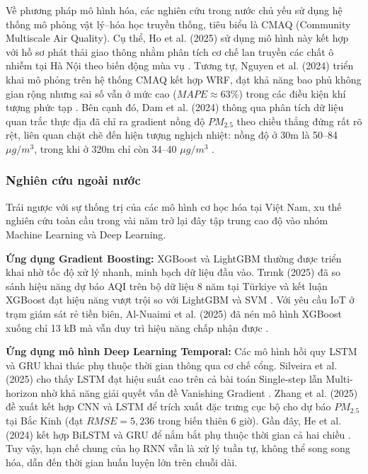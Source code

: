 Về phương pháp mô hình hóa, các nghiên cứu trong nước chủ yếu sử dụng hệ thống mô phỏng vật lý--hóa học truyền thống, tiêu biểu là CMAQ (Community Multiscale Air Quality). 
Cụ thể, Ho et al. (2025) sử dụng mô hình này kết hợp với hồ sơ phát thải giao thông nhằm phân tích cơ chế lan truyền các chất ô nhiễm tại Hà Nội theo biến động mùa vụ \cite{ho2025assessment}. Tương tự, Nguyen et al. (2024) triển khai mô phỏng trên hệ thống CMAQ kết hợp WRF, đạt khả năng bao phủ không gian rộng nhưng sai số vẫn ở mức cao ($MAPE \approx 63\%$) trong các điều kiện khí tượng phức tạp \cite{nguyen2024cmaq}. 
Bên cạnh đó, Dam et al. (2024) thông qua phân tích dữ liệu quan trắc thực địa đã chỉ ra gradient nồng độ $PM_{2.5}$ theo chiều thẳng đứng rất rõ rệt, liên quan chặt chẽ đến hiện tượng nghịch nhiệt: nồng độ ở 30m là 50--84 $\mu g/m^3$, trong khi ở 320m chỉ còn 34--40 $\mu g/m^3$ \cite{dam2024pm25}. 

\subsubsection{Nghiên cứu ngoài nước}

Trái ngược với sự thống trị của các mô hình cơ học hóa tại Việt Nam, xu thế nghiên cứu toàn cầu trong vài năm trở lại đây tập trung cao độ vào nhóm Machine Learning và Deep Learning.

\textbf{Ứng dụng Gradient Boosting:} XGBoost và LightGBM thường được triển khai nhờ tốc độ xử lý nhanh, minh bạch dữ liệu đầu vào. Tırınk (2025) đã so sánh hiệu năng dự báo AQI trên bộ dữ liệu 8 năm tại Türkiye và kết luận XGBoost đạt hiệu năng vượt trội so với LightGBM và SVM \cite{tirink2025aqi}. Với yêu cầu IoT ở trạm giám sát rẻ tiền biên, Al-Nuaimi et al. (2025) đã nén mô hình XGBoost xuống chỉ 13 kB mà vẫn duy trì hiệu năng chấp nhận được \cite{alnuaimi2025lightweight}.

\textbf{Ứng dụng mô hình Deep Learning Temporal:} Các mô hình hồi quy LSTM và GRU khai thác phụ thuộc thời gian thông qua cơ chế cổng. Silveira et al. (2025) cho thấy LSTM đạt hiệu suất cao trên cả bài toán Single-step lẫn Multi-horizon nhờ khả năng giải quyết vấn đề Vanishing Gradient \cite{silveira2025lstmgru}. Zhang et al. (2025) \cite{zhang2025cnnlstm} đề xuất kết hợp CNN và LSTM để trích xuất đặc trưng cục bộ cho dự báo $PM_{2.5}$ tại Bắc Kinh (đạt $RMSE = 5{,}236$ trong biến thiên 6 giờ). Gần đây, He et al. (2024) kết hợp BiLSTM và GRU để nắm bắt phụ thuộc thời gian cả hai chiều \cite{he2024bilstmgru}. Tuy vậy, hạn chế chung của họ RNN vẫn là xử lý tuần tự, không thể song song hóa, dẫn đến thời gian huấn luyện lớn trên chuỗi dài.

